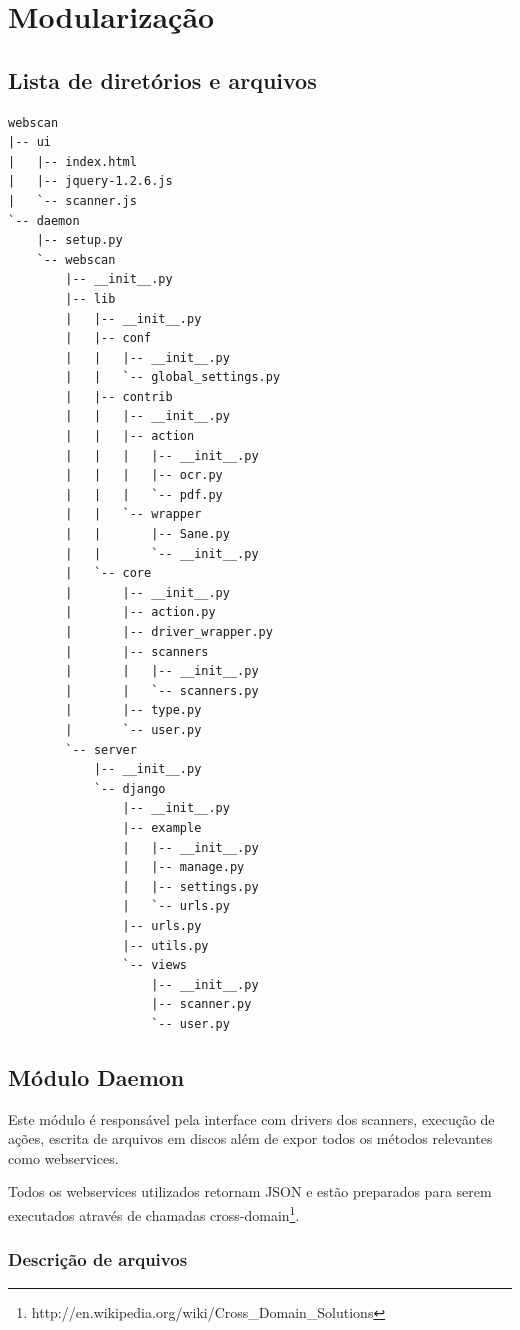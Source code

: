\section{Modularização}
\label{sec:modulos}


\subsection{Lista de diretórios e arquivos}

{\small 
\begin{verbatim}
webscan
|-- ui
|   |-- index.html
|   |-- jquery-1.2.6.js
|   `-- scanner.js
`-- daemon
    |-- setup.py
    `-- webscan
        |-- __init__.py
        |-- lib
        |   |-- __init__.py
        |   |-- conf
        |   |   |-- __init__.py
        |   |   `-- global_settings.py
        |   |-- contrib
        |   |   |-- __init__.py
        |   |   |-- action
        |   |   |   |-- __init__.py
        |   |   |   |-- ocr.py
        |   |   |   `-- pdf.py
        |   |   `-- wrapper
        |   |       |-- Sane.py
        |   |       `-- __init__.py
        |   `-- core
        |       |-- __init__.py
        |       |-- action.py
        |       |-- driver_wrapper.py
        |       |-- scanners
        |       |   |-- __init__.py
        |       |   `-- scanners.py
        |       |-- type.py
        |       `-- user.py
        `-- server
            |-- __init__.py
            `-- django
                |-- __init__.py
                |-- example
                |   |-- __init__.py
                |   |-- manage.py
                |   |-- settings.py
                |   `-- urls.py
                |-- urls.py
                |-- utils.py
                `-- views
                    |-- __init__.py
                    |-- scanner.py
                    `-- user.py
\end{verbatim}}

\subsection{Módulo Daemon}
Este módulo é responsável pela interface com drivers dos scanners, 
execução de ações, escrita de arquivos em discos além de expor todos 
os métodos relevantes como webservices.

Todos os webservices utilizados retornam JSON e estão preparados para
serem executados através de chamadas 
cross-domain\footnote{http://en.wikipedia.org/wiki/Cross\_Domain\_Solutions}.

\subsubsection{Descrição de arquivos}

